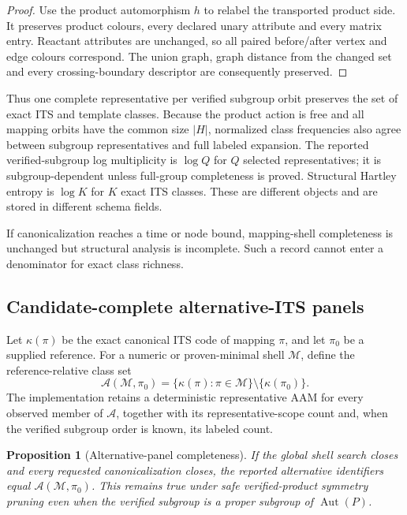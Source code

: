 \documentclass[11pt]{article}
\newtheorem{proposition}[theorem]{Proposition}
\theoremstyle{definition}
\newcommand{\Aut}{\operatorname{Aut}}
\begin{document}
\begin{proof}
Use the product automorphism \(h\) to relabel the transported product side.
It preserves product colours, every declared unary attribute and every matrix
entry.  Reactant attributes are unchanged, so all paired before/after vertex
and edge colours correspond.  The
union graph, graph distance from the changed set and every crossing-boundary
descriptor are consequently preserved.
\end{proof}

Thus one complete representative per verified subgroup orbit preserves the
set of exact ITS and template classes.  Because the product action is free and
all mapping orbits have the common size \(|H|\), normalized class frequencies
also agree between subgroup representatives and full labeled expansion.  The
reported verified-subgroup log multiplicity is \(\log Q\) for \(Q\) selected
representatives; it is subgroup-dependent unless full-group completeness is
proved.  Structural Hartley entropy is \(\log K\) for
\(K\) exact ITS classes.  These are different objects and are stored in
different schema fields.

If canonicalization reaches a time or node bound, mapping-shell completeness
is unchanged but structural analysis is incomplete.  Such a record cannot
enter a denominator for exact class richness.

\subsection{Candidate-complete alternative-ITS panels}

Let \(\kappa(\pi)\) be the exact canonical ITS code of mapping \(\pi\), and let
\(\pi_0\) be a supplied reference.  For a numeric or proven-minimal shell
\(\mathcal M\), define the reference-relative class set
\begin{equation}
 \mathcal A(\mathcal M,\pi_0)
 =\{\kappa(\pi):\pi\in\mathcal M\}\setminus\{\kappa(\pi_0)\}.
 \label{eq:si-alternative-panel}
\end{equation}
The implementation retains a deterministic representative AAM for every
observed member of \(\mathcal A\), together with its representative-scope count
and, when the verified subgroup order is known, its labeled count.

\begin{proposition}[Alternative-panel completeness]
If the global shell search closes and every requested canonicalization closes,
the reported alternative identifiers equal
\(\mathcal A(\mathcal M,\pi_0)\).  This remains true under safe verified-product
symmetry pruning even when the verified subgroup is a proper subgroup of
\(\Aut(P)\).
\end{proposition}
\end{document}
